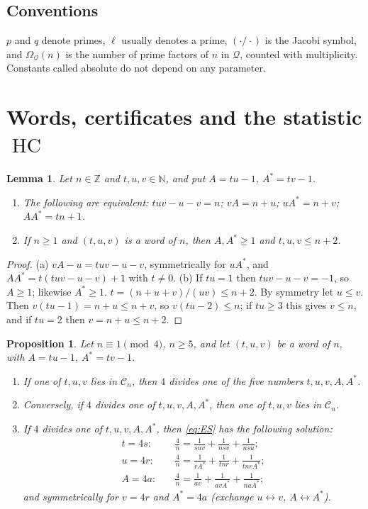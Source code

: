 \documentclass[11pt,reqno]{amsart}
\newtheorem{lemma}[theorem]{Lemma}
\newtheorem{proposition}[theorem]{Proposition}
\theoremstyle{definition}
\newcommand{\Z}{\mathbb Z}
\newcommand{\N}{\mathbb N}
\newcommand{\cC}{\mathcal C}
\newcommand{\cQ}{\mathcal Q}
\newcommand{\HC}{\operatorname{HC}}
\begin{document}
\subsection*{Conventions}
$p$ and $q$ denote primes, $\ell$ usually denotes a prime, $(\cdot/\cdot)$
is the Jacobi symbol, and $\Omega_\cQ(n)$ is the number of prime factors of
$n$ in $\cQ$, counted with multiplicity.  Constants called absolute do not
depend on any parameter.

\section{Words, certificates and the statistic \texorpdfstring{$\HC$}{HC}}\label{sec:words}

\begin{lemma}\label{lem:word}
Let $n\in\Z$ and $t,u,v\in\N$, and put $A=tu-1$, $A^*=tv-1$.
\begin{enumerate}
\item[(a)] The following are equivalent: $tuv-u-v=n$; $vA=n+u$;
$uA^*=n+v$; $AA^*=tn+1$.
\item[(b)] If $n\ge1$ and $(t,u,v)$ is a word of $n$, then $A,A^*\ge1$ and
$t,u,v\le n+2$.
\end{enumerate}
\end{lemma}

\begin{proof}
(a) $vA-u=tuv-u-v$, symmetrically for $uA^*$, and
$AA^*=t(tuv-u-v)+1$ with $t\ne0$.  (b) If $tu=1$ then $tuv-u-v=-1$, so
$A\ge1$; likewise $A^*\ge1$.  $t=(n+u+v)/(uv)\le n+2$.  By symmetry let
$u\le v$.  Then $v(tu-1)=n+u\le n+v$, so $v(tu-2)\le n$; if $tu\ge3$ this
gives $v\le n$, and if $tu=2$ then $v=n+u\le n+2$.
\end{proof}

\begin{proposition}\label{prop:slots}
Let $n\equiv1\pmod4$, $n\ge5$, and let $(t,u,v)$ be a word of $n$, with
$A=tu-1$, $A^*=tv-1$.
\begin{enumerate}
\item[(a)] If one of $t,u,v$ lies in $\cC_n$, then $4$ divides one of the
five numbers $t,u,v,A,A^*$.
\item[(b)] Conversely, if $4$ divides one of $t,u,v,A,A^*$, then one of
$t,u,v$ lies in $\cC_n$.
\item[(c)] If $4$ divides one of $t,u,v,A,A^*$, then \eqref{eq:ES} has the
following solution:
\begin{align*}
t=4s:&\quad \frac4n=\frac1{suv}+\frac1{nsv}+\frac1{nsu};\\
u=4r:&\quad \frac4n=\frac1{rA^*}+\frac1{tnr}+\frac1{tnrA^*};\\
A=4a:&\quad \frac4n=\frac1{av}+\frac1{avA^*}+\frac1{naA^*};
\end{align*}
and symmetrically for $v=4r$ and $A^*=4a$ (exchange $u\leftrightarrow v$,
$A\leftrightarrow A^*$).
\end{enumerate}
\end{proposition}
\end{document}
